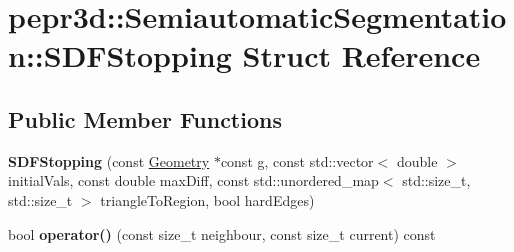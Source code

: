 \hypertarget{structpepr3d_1_1_semiautomatic_segmentation_1_1_s_d_f_stopping}{}\section{pepr3d\+::Semiautomatic\+Segmentation\+::S\+D\+F\+Stopping Struct Reference}
\label{structpepr3d_1_1_semiautomatic_segmentation_1_1_s_d_f_stopping}
\subsection*{Public Member Functions}
\begin{DoxyCompactItemize}
\item 
\mbox{\label{structpepr3d_1_1_semiautomatic_segmentation_1_1_s_d_f_stopping_a1321482ce712ee518a4012e496d65592}} 
{\bfseries S\+D\+F\+Stopping} (const \mbox{\hyperlink{classpepr3d_1_1_geometry}{Geometry}} $\ast$const g, const std\+::vector$<$ double $>$ initial\+Vals, const double max\+Diff, const std\+::unordered\+\_\+map$<$ std\+::size\+\_\+t, std\+::size\+\_\+t $>$ triangle\+To\+Region, bool hard\+Edges)
\item 
\mbox{\label{structpepr3d_1_1_semiautomatic_segmentation_1_1_s_d_f_stopping_a61e36e0c54ed8e70e7b7674010ab711e}} 
bool {\bfseries operator()} (const size\+\_\+t neighbour, const size\+\_\+t current) const
\end{DoxyCompactItemize}
